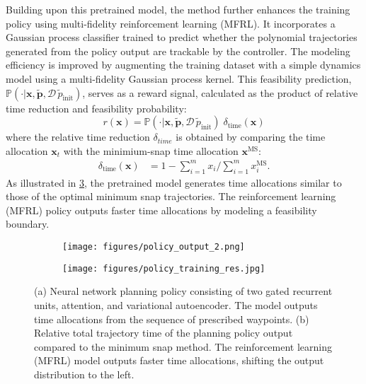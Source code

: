 Building upon this pretrained model, the method further enhances the training policy using multi-fidelity reinforcement learning (MFRL). 
It incorporates a Gaussian process classifier trained to predict whether the polynomial trajectories generated from the policy output are trackable by the controller. 
The modeling efficiency is improved by augmenting the training dataset with a simple dynamics model using a multi-fidelity Gaussian process kernel. 
This feasibility prediction, $\mathbb{P} (\cdot|\mathbf{x}, \tilde{\mathbf{p}}, \mathcal{D\,} \tilde p_{\text{init}})$, serves as a reward signal, calculated as the product of relative time reduction and feasibility probability:
\begin{equation}
    r(\mathbf{x}) = \mathbb{P}(\cdot|\mathbf{x}, \tilde{\mathbf{p}}, \mathcal{D\,} \tilde p_{\text{init}})\; \delta_{\text{time}}(\mathbf{x})
\end{equation}
where the relative time reduction $\delta_{time}$ is obtained by comparing the time allocation $\mathbf{x}_{t}$ with the minimium-snap time allocation $\mathbf{x}^{\text{MS}}$: 
\begin{align}
\delta_{\text{time}}(\mathbf{x}) &= 1 - {\sum \nolimits}_{i=1}^m x_{i} / {\sum \nolimits}_{i=1}^m x^{\text{MS}}_{i}.
\end{align}
As illustrated in \cref{fig:policy_res}, the pretrained model generates time allocations similar to those of the optimal minimum snap trajectories. 
The reinforcement learning (MFRL) policy outputs faster time allocations by modeling a feasibility boundary.

\begin{figure}[]
\centering
\begin{subfigure}[b]{0.23\textwidth}
    \captionsetup{justification=centering}
    \texttt{[image: figures/policy\_output\_2.png]}
    \vspace{-1\baselineskip}
    \caption{}
    \label{fig:policy}
\end{subfigure}
\begin{subfigure}[b]{0.23\textwidth}
    \captionsetup{justification=centering}
    \texttt{[image: figures/policy\_training\_res.jpg]}
    \vspace{-1\baselineskip}
    \caption{}
    \label{fig:policy_res}
\end{subfigure}
\caption{(a) Neural network planning policy consisting of two gated recurrent units, attention, and variational autoencoder. The model outputs time allocations from the sequence of prescribed waypoints. (b) Relative total trajectory time of the planning policy output compared to the minimum snap method. The reinforcement learning (MFRL) model outputs faster time allocations, shifting the output distribution to the left.}
\vspace{-1\baselineskip}
\end{figure}
